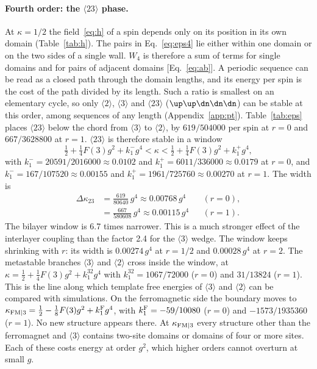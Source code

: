 \paragraph*{Fourth order: the $\langle23\rangle$ phase.}
At $\kappa=1/2$ the field~\eqref{eq:h} of a spin depends only on its position in its own domain
(Table~\ref{tab:h}). The pairs in Eq.~\eqref{eq:eps4} lie either within one domain or on the two sides of a
single wall. $W_4$ is therefore a sum of terms for single domains and for pairs of adjacent domains
[Eq.~\eqref{eq:ab}]. A periodic sequence can be read as a closed path through the domain lengths, and its
energy per spin is the cost of the path divided by its length. Such a ratio is smallest on an elementary
cycle, so only $\langle2\rangle$, $\langle3\rangle$ and $\langle23\rangle$ ($\up\up\dn\dn\dn$) can be stable at this
order, among sequences of any length (Appendix~\ref{app:pt}). Table~\ref{tab:eps} places $\langle23\rangle$
below the chord from $\langle3\rangle$ to $\langle2\rangle$, by $619/504000$ per spin at $r=0$ and $667/3628800$
at $r=1$.
$\langle23\rangle$ is therefore stable in a window
\begin{equation}
\tfrac12+\tfrac14F(3)g^2+k_1^-g^4<\kappa<\tfrac12+\tfrac14F(3)g^2+k_1^+g^4,
\label{eq:w23}
\end{equation}
with $k_1^-=20591/2016000\approx0.0102$ and $k_1^+=6011/336000\approx0.0179$ at $r=0$, and
$k_1^-=167/107520\approx0.00155$ and $k_1^+=1961/725760\approx0.00270$ at $r=1$.
The width is
\begin{align}
\Delta\kappa_{23}&=\tfrac{619}{80640}\,g^4\approx0.00768\,g^4 &&(r=0),\nonumber\\
&=\tfrac{667}{580608}\,g^4\approx0.00115\,g^4 &&(r=1).
\label{eq:width23}
\end{align}
The bilayer window is 6.7 times narrower. This is a much stronger effect of the interlayer coupling than the
factor 2.4 for the $\langle3\rangle$ wedge. The window keeps shrinking with $r$: its width is $0.00274\,g^4$ at
$r=1/2$ and $0.00028\,g^4$ at $r=2$.
The metastable branches $\langle3\rangle$ and $\langle2\rangle$ cross inside the window, at
$\kappa=\tfrac12+\tfrac14F(3)g^2+k_1^{32}g^4$ with $k_1^{32}=1067/72000$ ($r=0$) and $31/13824$ ($r=1$). This
is the line along which template free energies of $\langle3\rangle$ and $\langle2\rangle$ can be compared with
simulations.
On the ferromagnetic side the boundary moves to
$\kappa_{\rm FM|3}=\tfrac12-\tfrac18F(3)g^2+k_1^{\rm F}g^4$, with $k_1^{\rm F}=-59/10080$ ($r=0$) and
$-1573/1935360$ ($r=1$).
No new structure appears there. At $\kappa_{\rm FM|3}$ every structure other than the ferromagnet and
$\langle3\rangle$ contains two-site domains or domains of four or more sites. Each of these costs energy at
order $g^2$, which higher orders cannot overturn at small $g$.

